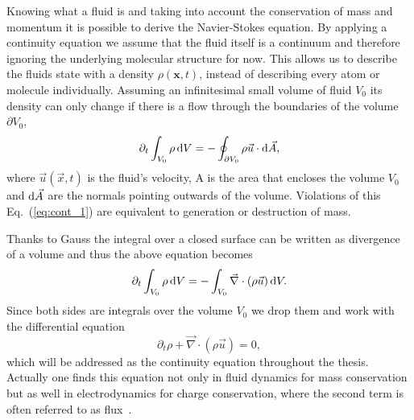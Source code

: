 Knowing what a fluid is and taking into account the conservation of mass and momentum it is possible to derive the Navier-Stokes equation. 
By applying a continuity equation we assume that the fluid itself is a continuum and therefore ignoring the underlying molecular structure for now. 
This allows us to describe the fluids state with a density $\rho(\mathbf{x},t)$, instead of describing every atom or molecule individually.
Assuming an infinitesimal small volume of fluid $V_0$ its density can only change if there is a flow through the boundaries of the volume $\partial V_0$,
\begin{equation}\label{eq:cont_1}
    \partial_t\int_{V_0}\rho\mathop{}\!\mathrm{d} V = -\oint_{\partial V_0} \rho\vec{u}\cdot\mathop{}\!\mathrm{d} \vec{A}, 
\end{equation}
where $\vec{u}(\vec{x},t)$ is the fluid's velocity, A is the area that encloses the volume $V_0$ and $\mathop{}\!\mathrm{d}\vec{A}$ are the normals pointing outwards of the volume.
Violations of this Eq.~(\ref{eq:cont_1}) are equivalent to generation or destruction of mass.

Thanks to Gauss the integral over a closed surface can be written as divergence of a volume and thus the above equation becomes~\cite{koniglichegesellschaftderwissenschaftenzugottingenCommentationesSocietatisRegiae1811}
\begin{equation}\label{eq:cont_2}
    \partial_t\int_{V_0}\rho\mathop{}\!\mathrm{d} V = -\int_{V_0} \vec{\nabla}\cdot(\rho\vec{u}) \mathop{}\!\mathrm{d} V. 
\end{equation}
Since both sides are integrals over the volume $V_0$ we drop them and work with the differential equation
\begin{equation}\label{eq:cont_3}
    \partial_t\rho + \vec{\nabla}\cdot(\rho\vec{u}) = 0,
\end{equation}
which will be addressed as the continuity equation throughout the thesis.
Actually one finds this equation not only in fluid dynamics for mass conservation but as well in electrodynamics for charge conservation, where the second term is often referred to as flux~\cite{jacksonClassicalElectrodynamics2021, griffithsIntroductionElectrodynamics2013}.

